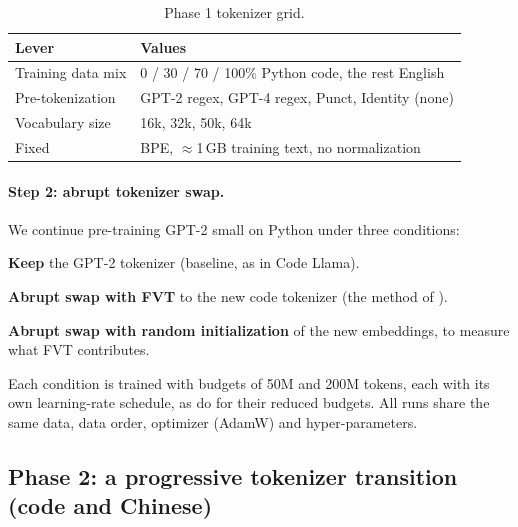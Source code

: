 \documentclass[11pt,a4paper]{article}
\begin{document}
\begin{table}[h]
\centering
\caption{Phase 1 tokenizer grid.}
\label{tab:grid}
\begin{tabular}{ll}
\toprule
Lever & Values \\
\midrule
Training data mix & 0 / 30 / 70 / 100\% Python code, the rest English \\
Pre-tokenization & GPT-2 regex, GPT-4 regex, Punct, Identity (none) \\
Vocabulary size & 16k, 32k, 50k, 64k \\
Fixed & BPE, $\approx$1\,GB training text, no normalization \\
\bottomrule
\end{tabular}
\end{table}

\paragraph{Step 2: abrupt tokenizer swap.} We continue pre-training GPT-2 small on Python under three conditions:
\begin{description}[leftmargin=0.8cm]
  \item[A] \textbf{Keep} the GPT-2 tokenizer (baseline, as in Code Llama).
  \item[B] \textbf{Abrupt swap with FVT} to the new code tokenizer (the method of \citet{dagan2024tokenizer}).
  \item[C] \textbf{Abrupt swap with random initialization} of the new embeddings, to measure what FVT contributes.
\end{description}
Each condition is trained with budgets of 50M and 200M tokens, each with its own learning-rate schedule, as \citet{dagan2024tokenizer} do for their reduced budgets. All runs share the same data, data order, optimizer (AdamW) and hyper-parameters.

\subsection{Phase 2: a progressive tokenizer transition (code and Chinese)}
\end{document}
